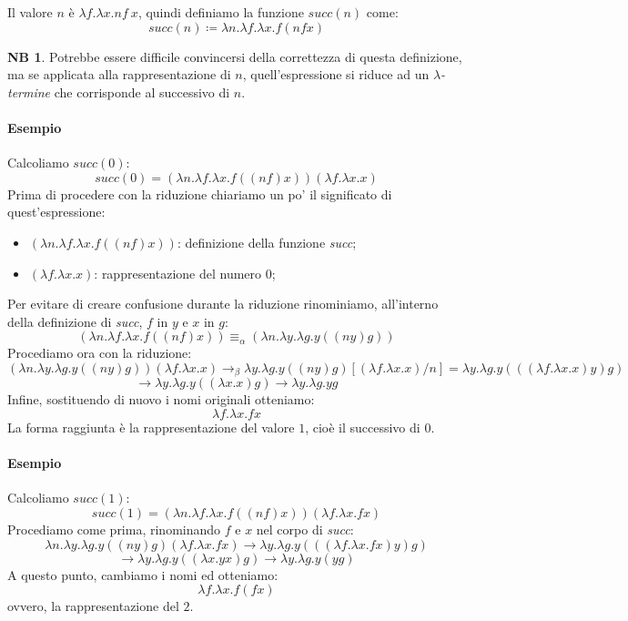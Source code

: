 \documentclass[12pt, a4paper]{report}
\theoremstyle{definition}
\newtheorem*{note}{NB}
\newcommand{\red}{\to_\beta}
\newcommand{\aeq}{\equiv_\alpha}
\begin{document}
Il valore $n$ è \(\lambda f.\lambda x.nf\ x\), quindi definiamo la funzione
$succ(n)$ come:
\[succ(n)\coloneqq\lambda n.\lambda f.\lambda x.f(nfx)\]

\begin{note}
    Potrebbe essere difficile convincersi della correttezza di questa definizione,
    ma se applicata alla rappresentazione di $n$, quell'espressione si riduce ad
    un \emph{$\lambda$-termine} che corrisponde al successivo di $n$.
\end{note}

\paragraph*{Esempio}
Calcoliamo $succ(0)$:
\[succ(0)=(\lambda n.\lambda f.\lambda x.f((nf)x))(\lambda f.\lambda x.x)\]
Prima di procedere con la riduzione chiariamo un po' il significato di quest'espressione:
\begin{itemize}
    \item \((\lambda n.\lambda f.\lambda x.f((nf)x))\): definizione della funzione
    \emph{succ};
    \item \((\lambda f.\lambda x.x)\): rappresentazione del numero $0$;
\end{itemize}
Per evitare di creare confusione durante la riduzione rinominiamo, all'interno
della definizione di \emph{succ}, $f$ in $y$ e $x$ in $g$:
\[(\lambda n.\lambda f.\lambda x.f((nf)x))\aeq(\lambda n.\lambda y.\lambda g.y((ny)g))\]
Procediamo ora con la riduzione:
\[(\lambda n.\lambda y.\lambda g.y((ny)g))(\lambda f.\lambda x.x)\red
\lambda y.\lambda g.y((ny)g)[(\lambda f.\lambda x.x)/n]=
\lambda y.\lambda g.y(((\lambda f.\lambda x.x)y)g)\]
\[\to\lambda y.\lambda g.y((\lambda x.x)g)\to\lambda y.\lambda g.yg\]
Infine, sostituendo di nuovo i nomi originali otteniamo:
\[\lambda f.\lambda x.fx\]
La forma raggiunta è la rappresentazione del valore $1$, cioè il successivo di $0$.

\paragraph*{Esempio}
Calcoliamo $succ(1)$:
\[succ(1)=(\lambda n.\lambda f.\lambda x.f((nf)x))(\lambda f.\lambda x.fx)\]
Procediamo come prima, rinominando $f$ e $x$ nel corpo di \emph{succ}:
\[\lambda n.\lambda y.\lambda g.y((ny)g)(\lambda f.\lambda x.fx)\to
\lambda y.\lambda g.y(((\lambda f.\lambda x.fx)y)g)\]
\[\to\lambda y.\lambda g.y((\lambda x.yx)g)\to\lambda y.\lambda g.y(yg)\]
A questo punto, cambiamo i nomi ed otteniamo:
\[\lambda f.\lambda x.f(fx)\]
ovvero, la rappresentazione del $2$.
\end{document}
